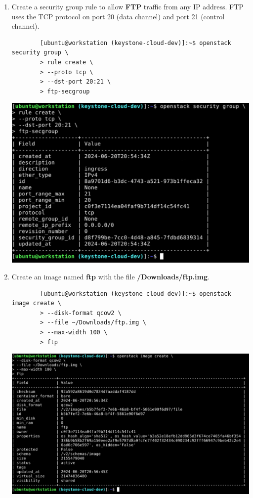 \documentclass[letterpaper, 12pt]{article}
\begin{document}
\begin{enumerate}
    \item Create a security group rule to allow \textbf{FTP} traffic from any IP address.
    FTP uses the TCP protocol on port 20 (data channel) and port 21 (control channel).
    \begin{lstlisting}
        [ubuntu@workstation (keystone-cloud-dev)]:~$ openstack security group \
        > rule create \
        > --proto tcp \
        > --dst-port 20:21 \
        > ftp-secgroup
    \end{lstlisting}

    \begin{center}
        \includegraphics[width=\linewidth]{images/part1/step35.png}
    \end{center}

    \item Create an image named \textbf{ftp} with the file \textbf{\texttildemid/Downloads/ftp.img}.
    \begin{lstlisting}
        [ubuntu@workstation (keystone-cloud-dev)]:~$ openstack image create \
        > --disk-format qcow2 \
        > --file ~/Downloads/ftp.img \
        > --max-width 100 \
        > ftp
    \end{lstlisting}

    \begin{center}
        \includegraphics[width=\linewidth]{images/part1/step36.png}
    \end{center}


\end{enumerate}
\end{document}
